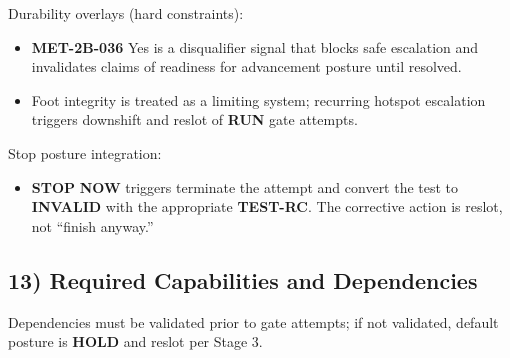 \documentclass[10pt]{article}
\begin{document}
Durability overlays (hard constraints):

\begin{itemize}
\item \textbf{MET-2B-036} Yes is a disqualifier signal that blocks safe escalation and invalidates claims of readiness for advancement posture until resolved.
\item Foot integrity is treated as a limiting system; recurring hotspot escalation triggers downshift and reslot of \textbf{RUN} gate attempts.
\end{itemize}

Stop posture integration:

\begin{itemize}
\item \textbf{STOP} \textbf{NOW} triggers terminate the attempt and convert the test to \textbf{INVALID} with the appropriate \textbf{TEST-RC}. The corrective action is reslot, not “finish anyway.”
\end{itemize}

\subsection*{13) Required Capabilities and Dependencies}

Dependencies must be validated prior to gate attempts; if not validated, default posture is \textbf{HOLD} and reslot per Stage 3.
\end{document}
